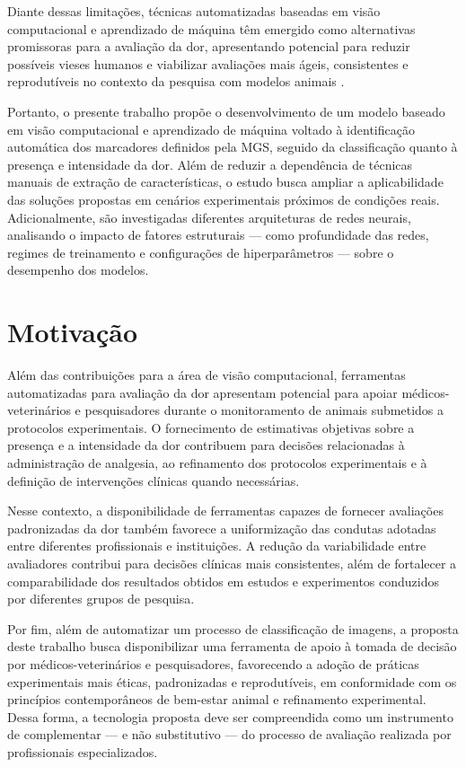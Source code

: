 Diante dessas limitações, técnicas automatizadas baseadas em visão computacional e aprendizado de máquina têm emergido como alternativas promissoras para a avaliação da dor, apresentando potencial para reduzir possíveis vieses humanos e viabilizar avaliações mais ágeis, consistentes e reprodutíveis no contexto da pesquisa com modelos animais \cite{Zamzmi2019}.

Portanto, o presente trabalho propõe o desenvolvimento de um modelo baseado em visão computacional e aprendizado de máquina voltado à identificação automática dos marcadores definidos pela \acs{MGS}, seguido da classificação quanto à presença e intensidade da dor. Além de reduzir a dependência de técnicas manuais de extração de características, o estudo busca ampliar a aplicabilidade das soluções propostas em cenários experimentais próximos de condições reais. Adicionalmente, são investigadas diferentes arquiteturas de redes neurais, analisando o impacto de fatores estruturais — como profundidade das redes, regimes de treinamento e configurações de hiperparâmetros — sobre o desempenho dos modelos.

\section{Motivação}

Além das contribuições para a área de visão computacional, ferramentas automatizadas para avaliação da dor apresentam potencial para apoiar médicos-veterinários e pesquisadores durante o monitoramento de animais submetidos a protocolos experimentais. O fornecimento de estimativas objetivas sobre a presença e a intensidade da dor contribuem para decisões relacionadas à administração de analgesia, ao refinamento dos protocolos experimentais e à definição de intervenções clínicas quando necessárias. 

Nesse contexto, a disponibilidade de ferramentas capazes de fornecer avaliações padronizadas da dor também favorece a uniformização das condutas adotadas entre diferentes profissionais e instituições. A redução da variabilidade entre avaliadores contribui para decisões clínicas mais consistentes, além de fortalecer a comparabilidade dos resultados obtidos em estudos e experimentos conduzidos por diferentes grupos de pesquisa.

Por fim, além de automatizar um processo de classificação de imagens, a proposta deste trabalho busca disponibilizar uma ferramenta de apoio à tomada de decisão por médicos-veterinários e pesquisadores, favorecendo a adoção de práticas experimentais mais éticas, padronizadas e reprodutíveis, em conformidade com os princípios contemporâneos de bem-estar animal e refinamento experimental. Dessa forma, a tecnologia proposta deve ser compreendida como um instrumento de complementar — e não substitutivo — do processo de avaliação realizada por profissionais especializados.

